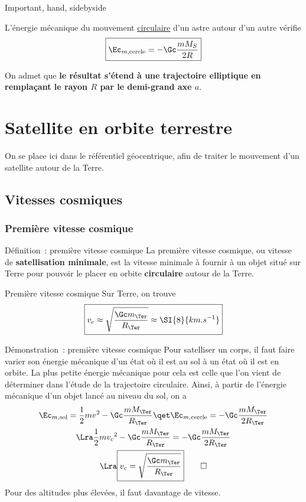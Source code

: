 \documentclass[../main/main.tex]{subfiles}
\begin{document}
\begin{tror}{Important, hand, sidebyside}
    \begin{center}
        \begin{bfseries}
            L'énergie mécanique du mouvement \ul{circulaire} d'un astre autour
            d'un autre vérifie
            \[\boxed{\Ec_{m,\rm cercle} = -\Gc\frac{mM_S}{2R}}\]
        \end{bfseries}
    \end{center}
    \tcblower
    On admet que \textbf{le résultat s'étend à une trajectoire elliptique en
    remplaçant le rayon $R$ par le demi-grand axe $a$}.
\end{tror}

\section{Satellite en orbite terrestre}
On se place ici dans le référentiel géocentrique, afin de traiter le mouvement
d'un satellite autour de la Terre.
\subsection{Vitesses cosmiques}
\subsubsection{Première vitesse cosmique}
\begin{tdefi}{Définition~: première vitesse cosmique}
    La première vitesse cosmique, ou vitesse de \textbf{satellisation minimale},
    est la vitesse minimale à fournir à un objet situé sur Terre pour pouvoir le
    placer en orbite \textbf{circulaire} autour de la Terre.
\end{tdefi}
\begin{tprop}{Première vitesse cosmique}
    Sur Terre, on trouve
    \[
        \boxed{v_c \approx \sqrt{\frac{\Gc m_\Ter}{R_\Ter}} \approx
        \SI{8}{km.s^{-1}}}
    \]
\end{tprop}
\begin{tdemo}{Démonstration~: première vitesse cosmique}
    Pour satelliser un corps, il faut faire varier son énergie mécanique d'un
    état où il est au sol à un état où il est en orbite. La plus petite énergie
    mécanique pour cela est celle que l'on vient de déterminer dans l'étude de
    la trajectoire circulaire. Ainsi, à partir de l'énergie mécanique d'un objet
    lancé au niveau du sol, on a
    \begin{gather*}
        \Ec_{m,\rm sol} = \frac{1}{2}mv^2 -\Gc \frac{mM_\Ter}{R_\Ter}
        \qet
        \Ec_{m,\rm cercle} = -\Gc \frac{mM_\Ter}{2R_\Ter}
        \\\Lra
        \frac{1}{2}mv_c{}^2 -\Gc \frac{mM_\Ter}{R_\Ter} = -\Gc \frac{mM_\Ter}{2R_\Ter}
        \\\Lra
        \boxed{v_c = \sqrt{\frac{\Gc m_\Ter}{R_\Ter}}}
        \qed
    \end{gather*}
    Pour des altitudes plus élevées, il faut davantage de vitesse.
\end{tdemo}
\end{document}
